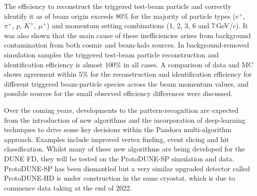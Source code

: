 \documentclass[epjc3]{svjour3}
\begin{document}
The efficiency to reconstruct the triggered test-beam particle and correctly identify it as of beam origin exceeds 80\% for the majority of particle types ($e^+$, $\pi^+$, $p$, $K^+$, $\mu^+$) and momentum setting combinations (1, 2, 3, 6 and 7\,GeV/$c$). It was also shown that the main cause of these inefficiencies arises from background contamination from both cosmic and beam-halo sources. In background-removed simulation samples the triggered test-beam particle reconstruction and identification efficiency is almost 100\% in all cases. A comparison of data and MC shows agreement within 5\% for the reconstruction and identification efficiency for different triggered beam-particle species across the beam momentum values, and possible sources for the small observed efficiency differences were discussed.

Over the coming years, developments to the pattern-recognition are expected from the introduction of new algorithms and the incorporation of deep-learning techniques to drive some key decisions within the Pandora multi-algorithm approach. Examples include improved vertex finding, event slicing and hit classification. Whilst many of these new algorithms are being developed for the DUNE FD, they will be tested on the ProtoDUNE-SP simulation and data. ProtoDUNE-SP has been dismantled but a very similar upgraded detector called ProtoDUNE-HD is under construction in the same cryostat, which is due to commence data taking at the end of 2022.

\begin{acknowledgements}

\end{acknowledgements}



\end{document}
